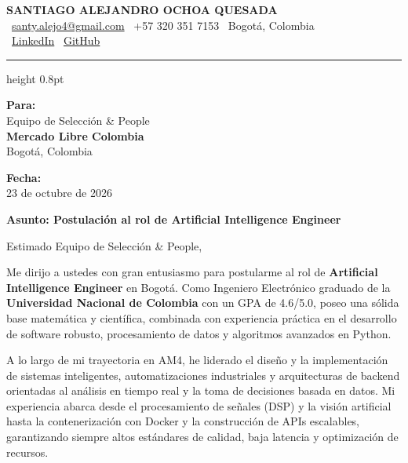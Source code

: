 \documentclass[11pt,a4paper]{article}
\begin{document}
\thispagestyle{empty}
\color{darktext}

\begin{center}
    {\Huge \bfseries\color{accent} SANTIAGO ALEJANDRO OCHOA QUESADA} \\[6pt]
    {\small\color{darktext}
    \faEnvelope\ \href{mailto:santy.alejo4@gmail.com}{santy.alejo4@gmail.com}
    \quad\textcolor{bulletline}{\textbar}\quad
    \faPhone\ +57 320 351 7153
    \quad\textcolor{bulletline}{\textbar}\quad
    \faMapMarker*\ Bogotá, Colombia \\[4pt]
    \faLinkedin\ \href{https://linkedin.com/in/santiago-alejandro-ochoa-quesada-a07a18288/}{LinkedIn}
    \quad\textcolor{bulletline}{\textbar}\quad
    \faGithub\ \href{https://github.com/Sochoaq}{GitHub}
    }
\end{center}
\vspace{2pt}
{\color{bulletline}\hrule height 0.8pt}
\vspace{10pt}

\noindent
\begin{minipage}[t]{0.62\textwidth}
    \textbf{\color{accent} Para:}\\
    Equipo de Selección \& People\\
    \textbf{Mercado Libre Colombia}\\
    Bogotá, Colombia
\end{minipage}
\hfill
\begin{minipage}[t]{0.35\textwidth}\raggedleft
    \textbf{\color{accent} Fecha:}\\
    23 de octubre de 2026
\end{minipage}

\vspace{6pt}
\noindent
{\large\bfseries\color{accent} Asunto: Postulación al rol de Artificial Intelligence Engineer}
\vspace{2pt}

\noindent Estimado Equipo de Selección \& People,

Me dirijo a ustedes con gran entusiasmo para postularme al rol de \textbf{Artificial Intelligence Engineer} en Bogotá. Como Ingeniero Electrónico graduado de la \textbf{Universidad Nacional de Colombia} con un GPA de 4.6/5.0, poseo una sólida base matemática y científica, combinada con experiencia práctica en el desarrollo de software robusto, procesamiento de datos y algoritmos avanzados en Python.

A lo largo de mi trayectoria en AM4, he liderado el diseño y la implementación de sistemas inteligentes, automatizaciones industriales y arquitecturas de backend orientadas al análisis en tiempo real y la toma de decisiones basada en datos. Mi experiencia abarca desde el procesamiento de señales (DSP) y la visión artificial hasta la contenerización con Docker y la construcción de APIs escalables, garantizando siempre altos estándares de calidad, baja latencia y optimización de recursos.
\end{document}
